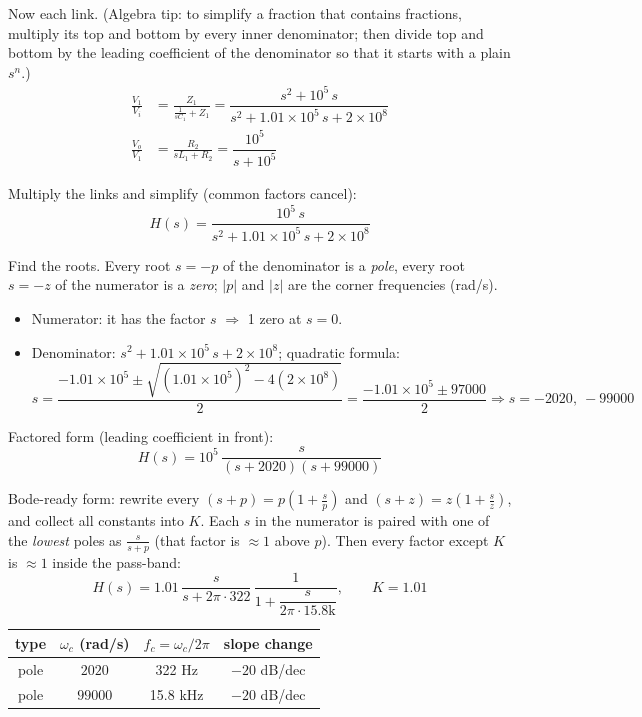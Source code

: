 \documentclass[11pt]{article}
\newcommand{\solstep}[2]{\par\medskip{\color{stepc}\textbf{Step #1 --- #2}}\par\nopagebreak}
\begin{document}
Now each link. {\small (Algebra tip: to simplify a fraction that contains fractions, multiply its top and bottom by every inner denominator; then divide top and bottom by the leading coefficient of the denominator so that it starts with a plain $s^n$.)}
\begin{align*}
\frac{V_{1}}{V_{i}} &= \frac{Z_{1}}{\frac{1}{sC_{1}} + Z_{1}} = \dfrac{s^{2} + 10^{5}\,s}{s^{2} + 1.01\times 10^{5}\,s + 2\times 10^{8}} \\
\frac{V_{o}}{V_{1}} &= \frac{R_{2}}{sL_{1} + R_{2}} = \dfrac{10^{5}}{s + 10^{5}}
\end{align*}

Multiply the links and simplify (common factors cancel):\[
H(s) = \dfrac{10^{5}\,s}{s^{2} + 1.01\times 10^{5}\,s + 2\times 10^{8}}
\]

\solstep{5}{Standard (Bode-ready) form}Find the roots. Every root $s=-p$ of the denominator is a \emph{pole}, every root $s=-z$ of the numerator is a \emph{zero}; $|p|$ and $|z|$ are the corner frequencies (rad/s).
\begin{itemize}[leftmargin=*,itemsep=2pt]
\item Numerator: it has the factor $s$ $\Rightarrow$ 1 zero at $s=0$.
\item Denominator: $s^{2} + 1.01\times 10^{5}\,s + 2\times 10^{8}$; quadratic formula:\[
s = \frac{-1.01\times 10^{5} \pm \sqrt{(1.01\times 10^{5})^2 - 4(2\times 10^{8})}}{2} = \frac{-1.01\times 10^{5} \pm 97000}{2} \Rightarrow s = -2020,\ -99000
\]

\end{itemize}

Factored form (leading coefficient in front):
\[
H(s) = 10^{5}\,\dfrac{s}{(s+2020)(s+99000)}
\]

Bode-ready form: rewrite every $(s+p) = p\left(1+\frac{s}{p}\right)$ and $(s+z) = z\left(1+\frac{s}{z}\right)$, and collect all constants into $K$. Each $s$ in the numerator is paired with one of the \emph{lowest} poles as $\frac{s}{s+p}$ (that factor is $\approx 1$ above $p$). Then every factor except $K$ is $\approx 1$ inside the pass-band:
\[
H(s) = 1.01\,\dfrac{s}{s+2\pi\cdot 322}\,\dfrac{1}{1+\dfrac{s}{2\pi\cdot 15.8\mathrm{k}}},\qquad K = 1.01
\]

\begin{center}\renewcommand{\arraystretch}{1.35}
\begin{tabular}{cccc}
\toprule
type & $\omega_c$ (rad/s) & $f_c=\omega_c/2\pi$ & slope change \\
\midrule
pole & $2020$ & 322 Hz & $-20$ dB/dec \\
pole & $99000$ & 15.8 kHz & $-20$ dB/dec \\
\bottomrule
\end{tabular}\end{center}
\end{document}
